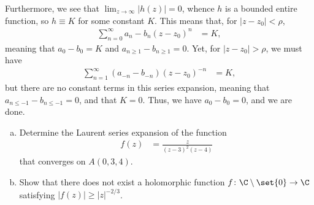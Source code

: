 \documentclass[10pt]{mypackage}
\begin{document}
\begin{solution}
  Furthermore, we see that $\lim_{z\rightarrow\infty} \left\vert h(z) \right\vert = 0$, whence $h$ is a bounded entire function, so $h\equiv K$ for some constant $K$. This means that, for $\left\vert z-z_0 \right\vert < \rho$,
  \begin{align*}
    \sum_{n=0}^{\infty}a_n-b_n\left( z-z_0 \right)^{n} &= K,
  \end{align*}
  meaning that $a_0-b_0 = K$ and $a_{n\geq 1} - b_{n\geq 1} = 0$. Yet, for $\left\vert z-z_0 \right\vert > \rho$, we must have
  \begin{align*}
    \sum_{n=1}^{\infty}\left( a_{-n}-b_{-n} \right) \left( z-z_0 \right)^{-n} &= K,
  \end{align*}
  but there are no constant terms in this series expansion, meaning that $a_{n \leq -1} - b_{n \leq -1} = 0$, and that $K = 0$. Thus, we have $a_0 - b_0 = 0$, and we are done.
\end{solution}
\begin{problem}[Problem 2]\hfill
  \begin{enumerate}[(a)]
    \item Determine the Laurent series expansion of the function
      \begin{align*}
        f(z) &= \frac{z}{\left( z-3 \right)^2\left( z-4 \right)}
      \end{align*}
      that converges on $A\left( 0,3,4 \right)$. 
    \item Show that there does not exist a holomorphic function $f\colon \C\setminus \set{0}\rightarrow \C$ satisfying $ \left\vert f(z) \right\vert\geq \left\vert z \right\vert^{-2/3} $.
  \end{enumerate}
\end{problem}
\end{document}
